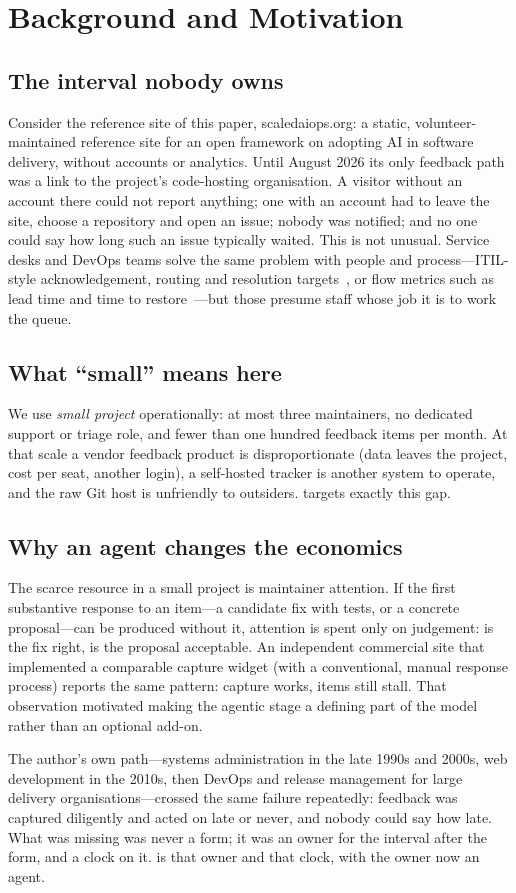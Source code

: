 \section{Background and Motivation}
\subsection{The interval nobody owns}
Consider the reference site of this paper, scaledaiops.org: a static, volunteer-maintained reference site for an open framework on adopting AI in software delivery, without accounts or analytics. Until August 2026 its only feedback path was a link to the project's code-hosting organisation. A visitor without an account there could not report anything; one with an account had to leave the site, choose a repository and open an issue; nobody was notified; and no one could say how long such an issue typically waited. This is not unusual. Service desks and DevOps teams solve the same problem with people and process---ITIL-style acknowledgement, routing and resolution targets~\cite{axelos2019itil}, or flow metrics such as lead time and time to restore~\cite{forsgren2018accelerate}---but those presume staff whose job it is to work the queue.

\subsection{What ``small'' means here}
We use \emph{small project} operationally: at most three maintainers, no dedicated support or triage role, and fewer than one hundred feedback items per month. At that scale a vendor feedback product is disproportionate (data leaves the project, cost per seat, another login), a self-hosted tracker is another system to operate, and the raw Git host is unfriendly to outsiders. \ffrs{} targets exactly this gap.

\subsection{Why an agent changes the economics}
The scarce resource in a small project is maintainer attention. If the first substantive response to an item---a candidate fix with tests, or a concrete proposal---can be produced without it, attention is spent only on judgement: is the fix right, is the proposal acceptable. An independent commercial site that implemented a comparable capture widget (with a conventional, manual response process) reports the same pattern: capture works, items still stall. That observation motivated making the agentic stage a defining part of the model rather than an optional add-on.

The author's own path---systems administration in the late 1990s and 2000s, web development in the 2010s, then DevOps and release management for large delivery organisations---crossed the same failure repeatedly: feedback was captured diligently and acted on late or never, and nobody could say how late. What was missing was never a form; it was an owner for the interval after the form, and a clock on it. \ffrs{} is that owner and that clock, with the owner now an agent.
